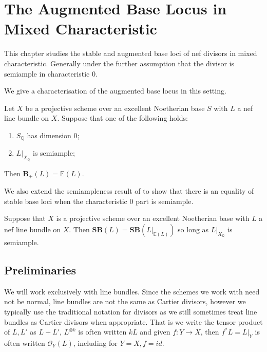 \documentclass[a4paper,12pt]{book}
\newcommand{\SB}{\mathbf{SB}}
\newcommand{\BS}{\mathbf{B}_{+}}
\newcommand{\ox}[1][X]{\mathcal{O}_{#1}}
\begin{document}
\chapter{The Augmented Base Locus in Mixed Characteristic}

This chapter studies the stable and augmented base loci of nef divisors in mixed characteristic. Generally under the further assumption that the divisor is semiample in characteristic $0$.

We give a characterisation of the augmented base locus in this setting.

\begin{theorem}
Let $X$ be a projective scheme over an excellent Noetherian base $S$ with $L$ a nef line bundle on $X$. 
Suppose that one of the following holds:
\begin{enumerate}
	\item $S_{\mathbb{Q}}$ has dimension $0$;
	\item $L|_{X_{\mathbb{Q}}}$ is semiample;
\end{enumerate}

Then $\BS(L)=\mathbb{E}(L)$.
\end{theorem}

We also extend the semiampleness result of \cite{witaszek2020keels} to show that there is an equality of stable base loci when the characteristic $0$ part is semiample.
 
 \begin{theorem}
 	Suppose that $X$ is a projective scheme over an excellent Noetherian base with $L$ a nef line bundle on $X$. Then $\SB(L)=\SB(L|_{\mathbb{E}(L)})$ so long as $L|_{X_{\mathbb{Q}}}$ is semiample.
 \end{theorem}


\section{Preliminaries}

We will work exclusively with line bundles. Since the schemes we work with need not be normal, line bundles are not the same as Cartier divisors, however we typically use the traditional notation for divisors as we still sometimes treat line bundles as Cartier divisors when appropriate. That is we write the tensor product of $L,L'$ as $L+L'$, $L^{\otimes k}$ is often written $kL$ and given $f:Y \to X$, then $f^{*}L=L|_{Y}$ is often written $\ox[Y](L)$, including for $Y=X, f=id$. 
\end{document}
